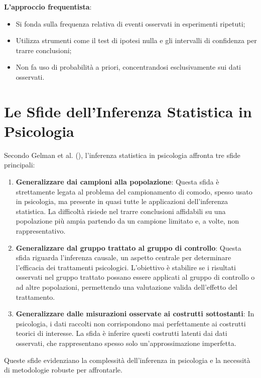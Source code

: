 \documentclass[
  letterpaper,
  DIV=11,
  numbers=noendperiod]{scrreprt}
\providecommand{\tightlist}{%
  \setlength{\itemsep}{0pt}\setlength{\parskip}{0pt}}\usepackage{longtable,booktabs,array}
\theoremstyle{definition}
\theoremstyle{remark}
\begin{document}
\textbf{L'approccio frequentista}:

\begin{itemize}
\tightlist
\item
  Si fonda sulla frequenza relativa di eventi osservati in esperimenti
  ripetuti;
\item
  Utilizza strumenti come il test di ipotesi nulla e gli intervalli di
  confidenza per trarre conclusioni;
\item
  Non fa uso di probabilità a priori, concentrandosi esclusivamente sui
  dati osservati.
\end{itemize}

\section{Le Sfide dell'Inferenza Statistica in
Psicologia}\label{le-sfide-dellinferenza-statistica-in-psicologia}

Secondo Gelman et al. (),
l'inferenza statistica in psicologia affronta tre sfide principali:

\begin{enumerate}
\def\labelenumi{\arabic{enumi}.}
\item
  \textbf{Generalizzare dai campioni alla popolazione}: Questa sfida è
  strettamente legata al problema del campionamento di comodo, spesso
  usato in psicologia, ma presente in quasi tutte le applicazioni
  dell'inferenza statistica. La difficoltà risiede nel trarre
  conclusioni affidabili su una popolazione più ampia partendo da un
  campione limitato e, a volte, non rappresentativo.
\item
  \textbf{Generalizzare dal gruppo trattato al gruppo di controllo}:
  Questa sfida riguarda l'inferenza causale, un aspetto centrale per
  determinare l'efficacia dei trattamenti psicologici. L'obiettivo è
  stabilire se i risultati osservati nel gruppo trattato possano essere
  applicati al gruppo di controllo o ad altre popolazioni, permettendo
  una valutazione valida dell'effetto del trattamento.
\item
  \textbf{Generalizzare dalle misurazioni osservate ai costrutti
  sottostanti}: In psicologia, i dati raccolti non corrispondono mai
  perfettamente ai costrutti teorici di interesse. La sfida è inferire
  questi costrutti latenti dai dati osservati, che rappresentano spesso
  solo un'approssimazione imperfetta.
\end{enumerate}

Queste sfide evidenziano la complessità dell'inferenza in psicologia e
la necessità di metodologie robuste per affrontarle.
\end{document}
